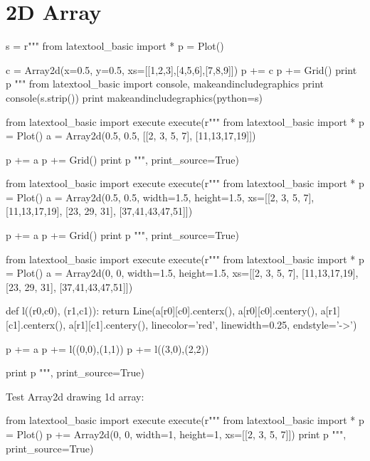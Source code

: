 \section{2D Array}

\begin{samepage}
\begin{python}
s = r"""
from latextool_basic import *
p = Plot()

c = Array2d(x=0.5, y=0.5, xs=[[1,2,3],[4,5,6],[7,8,9]])
p += c
p += Grid()
print p
"""
from latextool_basic import console, makeandincludegraphics
print console(s.strip())
print makeandincludegraphics(python=s)
\end{python}
\end{samepage}


\begin{python}
from latextool_basic import execute
execute(r"""
from latextool_basic import *
p = Plot()
a = Array2d(0.5, 0.5, [[2, 3, 5, 7], [11,13,17,19]])

p += a 
p += Grid()
print p
""", print_source=True)
\end{python}


\begin{python}
from latextool_basic import execute
execute(r"""
from latextool_basic import *
p = Plot()
a = Array2d(0.5, 0.5, width=1.5, height=1.5, xs=[[2, 3, 5, 7], [11,13,17,19], [23, 29, 31], [37,41,43,47,51]])

p += a
p += Grid() 
print p
""", print_source=True)
\end{python}


\begin{python}
from latextool_basic import execute
execute(r"""
from latextool_basic import *
p = Plot()
a = Array2d(0, 0, width=1.5, height=1.5, xs=[[2, 3, 5, 7], [11,13,17,19], [23, 29, 31], [37,41,43,47,51]])

def l((r0,c0), (r1,c1)):
    return Line(a[r0][c0].centerx(), a[r0][c0].centery(),
           a[r1][c1].centerx(), a[r1][c1].centery(),
           linecolor='red', linewidth=0.25, endstyle='->')

p += a
p += l((0,0),(1,1))
p += l((3,0),(2,2))

print p
""", print_source=True)
\end{python}


Test Array2d drawing 1d array:
\begin{python}
from latextool_basic import execute
execute(r"""
from latextool_basic import *
p = Plot()
p += Array2d(0, 0, width=1, height=1, xs=[[2, 3, 5, 7]])
print p
""", print_source=True)
\end{python}

